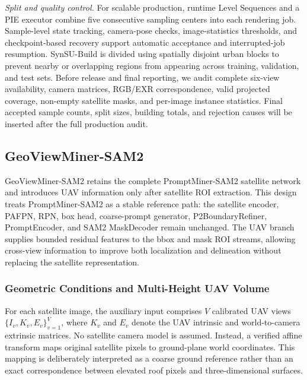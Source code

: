 \documentclass[letterpaper,journal]{IEEEtran}
\begin{document}
\noindent\textit{Split and quality control.}
For scalable production, runtime Level Sequences and a PIE executor combine five consecutive sampling centers into each rendering job. Sample-level state tracking, camera-pose checks, image-statistics thresholds, and checkpoint-based recovery support automatic acceptance and interrupted-job resumption. SynSU-Build is divided using spatially disjoint urban blocks to prevent nearby or overlapping regions from appearing across training, validation, and test sets. Before release and final reporting, we audit complete six-view availability, camera matrices, RGB/EXR correspondence, valid projected coverage, non-empty satellite masks, and per-image instance statistics. Final accepted sample counts, split sizes, building totals, and rejection causes will be inserted after the full production audit.

\enlargethispage{\baselineskip}
\subsection{GeoViewMiner-SAM2}
\label{sec:dual_method}

GeoViewMiner-SAM2 retains the complete PromptMiner-SAM2 satellite network and introduces UAV information only after satellite ROI extraction. This design treats PromptMiner-SAM2 as a stable reference path: the satellite encoder, PAFPN, RPN, box head, coarse-prompt generator, P2BoundaryRefiner, PromptEncoder, and SAM2 MaskDecoder remain unchanged. The UAV branch supplies bounded residual features to the bbox and mask ROI streams, allowing cross-view information to improve both localization and delineation without replacing the satellite representation.

\subsubsection{Geometric Conditions and Multi-Height UAV Volume}
For each satellite image, the auxiliary input comprises $V$ calibrated UAV views $\{I_v,K_v,E_v\}_{v=1}^{V}$, where $K_v$ and $E_v$ denote the UAV intrinsic and world-to-camera extrinsic matrices. No satellite camera model is assumed. Instead, a verified affine transform maps original satellite pixels to ground-plane world coordinates. This mapping is deliberately interpreted as a coarse ground reference rather than an exact correspondence between elevated roof pixels and three-dimensional surfaces.
\end{document}
